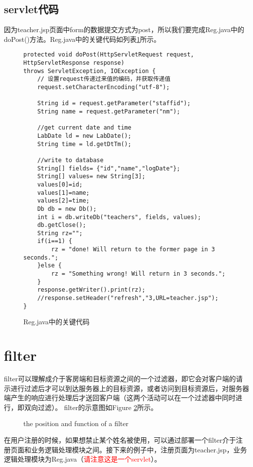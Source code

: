 \subsection{servlet代码}
因为teacher.jsp页面中form的数据提交方式为post，所以我们要完成Reg.java中的doPost()方法。Reg.java中的关键代码如列表\ref{reg}所示。
\begin{figure}
\begin{lstlisting}
protected void doPost(HttpServletRequest request, HttpServletResponse response) 
throws ServletException, IOException {
	// 设置request传递过来值的编码，并获取传递值
	request.setCharacterEncoding("utf-8");
	
	String id = request.getParameter("staffid");
	String name = request.getParameter("nm");
	
	//get current date and time
	LabDate ld = new LabDate();
	String time = ld.getDtTm();
	
	//write to database
	String[] fields= {"id","name","logDate"};
	String[] values= new String[3];
	values[0]=id;
	values[1]=name;
	values[2]=time;
	Db db = new Db();
	int i = db.writeDb("teachers", fields, values);
	db.getClose();
	String rz="";
	if(i==1) {
		rz = "done! Will return to the former page in 3 seconds.";
	}else {
		rz = "Something wrong! Will return in 3 seconds.";
	}
	response.getWriter().print(rz);
	//response.setHeader("refresh","3,URL=teacher.jsp");
}
\end{lstlisting}
\caption{Reg.java中的关键代码}
\label{reg}
\end{figure}

\section{filter}
filter可以理解成介于客房端和目标资源之间的一个过滤器，即它会对客户端的请示进行过滤后才可以到达服务器上的目标资源，或者访问到目标资源后，对服务器端产生的响应进行处理后才送回客户端（这两个活动可以在一个过滤器中同时进行，即双向过滤）。
filter的示意图如Figure \ref{filter}所示。
\begin{figure}
\caption{the position and function of a filter}
\label{filter}
\end{figure}
在用户注册的时候，如果想禁止某个姓名被使用，可以通过部署一个filter介于注册页面和业务逻辑处理模块之间。接下来的例子中，注册页面为teacher.jsp，业务逻辑处理模块为Reg.java（\textcolor{red}{请注意这是一个servlet}）。

